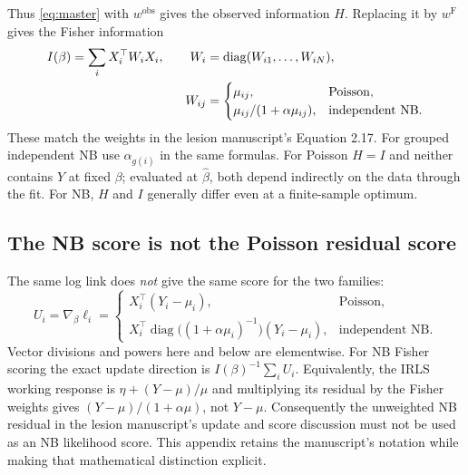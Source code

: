 \documentclass[11pt,a4paper]{article}
\newcommand{\diag}{\operatorname{diag}}
\numberwithin{equation}{section}
\begin{document}
Thus \eqref{eq:master} with $w^{\mathrm{obs}}$ gives the observed information
$H$. Replacing it by $w^{\mathrm F}$ gives the Fisher information
\begin{align}\label{eq:fisher}
 I(\beta)=\sum_i X_i^\top W_iX_i,\qquad
 W_i&=\diag(W_{i1},\ldots,W_{iN}),\\
 W_{ij}&=
 \begin{cases}
 \mu_{ij},&\text{Poisson},\\
 \mu_{ij}/(1+\alpha\mu_{ij}),&\text{independent NB}.
 \end{cases}\notag
\end{align}
These match the weights in the lesion manuscript's Equation 2.17.
For grouped independent NB use $\alpha_{g(i)}$ in the same formulas.
For Poisson $H=I$ and
neither contains $Y$ at fixed $\beta$; evaluated at $\widehat\beta$, both
depend indirectly on the data through the fit. For NB, $H$ and $I$ generally
differ even at a finite-sample optimum.

\subsection{The NB score is not the Poisson residual score}
The same log link does \emph{not} give the same score for the two families:
\begin{equation}\label{eq:nb-score}
 U_i=\nabla_\beta\ell_i=
 \begin{cases}
 X_i^\top(Y_i-\mu_i),&\text{Poisson},\\
 X_i^\top\diag\bigl((1+\alpha\mu_i)^{-1}\bigr)(Y_i-\mu_i),
       &\text{independent NB}.
 \end{cases}
\end{equation}
Vector divisions and powers here and below are elementwise.
For NB Fisher scoring the exact update direction is
$I(\beta)^{-1}\sum_i U_i$. Equivalently, the IRLS working response is
$\eta+(Y-\mu)/\mu$ and multiplying its residual by the Fisher weights gives
$(Y-\mu)/(1+\alpha\mu)$, not $Y-\mu$.
Consequently the unweighted NB residual in the lesion manuscript's update and
score discussion must not be used as an NB likelihood score. This appendix
retains the manuscript's notation while making that mathematical distinction explicit.
\end{document}
